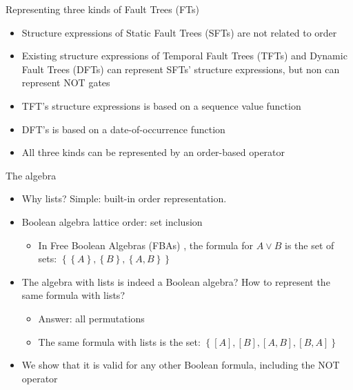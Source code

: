 \documentclass{beamer}
\def\FT{%
	Fault Tree (FT)%
	\gdef\FT{FT\xspace}%
	\gdef\FTs{FTs\xspace}%
	\gdef\IFT{An FT\xspace}%
	\xspace%
}
\def\FTs{%
	Fault Trees (FTs)%
	\gdef\FT{FT\xspace}%
	\gdef\FTs{FTs\xspace}%
	\gdef\IFT{An FT\xspace}%
	\xspace%
}
\def\IFT{%
	A Fault Tree (FT)%
	\gdef\FT{FT\xspace}%
	\gdef\FTs{FTs\xspace}%
	\gdef\IFT{An FT\xspace}%
	\xspace%
}
\def\SFT{%
	Static Fault Tree (SFT)%
	\gdef\SFT{SFT\xspace}%
	\gdef\SFTs{SFTs\xspace}%
	\xspace%
}
\def\SFTs{%
	Static Fault Trees (SFTs)%
	\gdef\SFT{SFT\xspace}%
	\gdef\SFTs{SFTs\xspace}%
	\xspace%
}
\def\TFT{%
	Temporal Fault Tree (TFT)%
	\gdef\TFT{TFT\xspace}%
	\gdef\TFTs{TFTs\xspace}%
	\xspace%
}
\def\TFTs{%
	Temporal Fault Trees (TFTs)%
	\gdef\TFT{TFT\xspace}%
	\gdef\TFTs{TFTs\xspace}%
	\xspace%
}
\def\DFT{%
	Dynamic Fault Tree (DFT)%
	\gdef\DFT{DFT\xspace}%
	\gdef\DFTs{DFTs\xspace}%
	\xspace%
}
\def\DFTs{%
	Dynamic Fault Trees (DFTs)%
	\gdef\DFT{DFT\xspace}%
	\gdef\DFTs{DFTs\xspace}%
	\xspace%
}
\def\FBA{%
	Free Boolean Algebra (FBA)%
	\gdef\FBA{FBA\xspace}%
	\gdef\FBAs{FBAs\xspace}%
	\gdef\iFBA{an FBA\xspace}%
	\xspace%
}
\def\FBAs{%
	Free Boolean Algebras (FBAs)%
	\gdef\FBA{FBA\xspace}%
	\gdef\FBAs{FBAs\xspace}%
	\gdef\iFBA{an FBA\xspace}%
	\xspace%
}
\def\iFBA{%
	a Free Boolean Algebra (FBA)%
	\gdef\FBA{FBA\xspace}%
	\gdef\FBAs{FBAs\xspace}%
	\gdef\iFBA{an FBA\xspace}%
	\xspace%
}
\begin{document}
\begin{frame}{Representing three kinds of \FTs}
	\begin{itemize}
		\item Structure expressions of \SFTs are not related to order
		\item Existing structure expressions of \TFTs and \DFTs can represent \SFTs' structure expressions, but non can represent NOT gates
		\item \TFT's structure expressions is based on a sequence value function
		\item \DFT's is based on a date-of-occurrence function
		\item All three kinds can be represented by an order-based operator
	\end{itemize}
\end{frame}

\begin{frame}{The algebra}
	\begin{itemize}
		\item Why lists? Simple: built-in order representation.
		\item Boolean algebra lattice order: set inclusion
		\begin{itemize}
			\item In \FBAs, the formula for $A \lor B$ is the set of sets: 
			$\left\{
				\left\{A\right\},
				\left\{B\right\},
				\left\{A,B\right\}
			\right\}$
		\end{itemize}
		\item The algebra with lists is indeed a Boolean algebra? How to represent the same formula with lists? 
		\begin{itemize}
			\item Answer: all permutations
			\item The same formula with lists is the set: 
			$\left\{
				\left[A\right],
				\left[B\right],
				\left[A,B\right],
				\left[B,A\right]
			\right\}$
		\end{itemize}
		\item We show that it is valid for any other Boolean formula, including the NOT operator %
	\end{itemize}
\end{frame}
\end{document}
